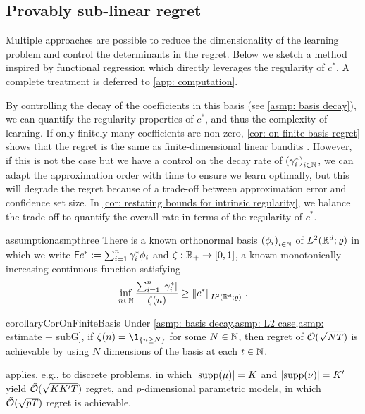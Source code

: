 \subsection{Provably sub-linear regret}\label{subsec: computability}

Multiple approaches are possible to reduce the dimensionality of the learning problem and control the determinants in the regret. Below we sketch a method inspired by functional regression \citep{morris_functional_2015} which directly leverages the regularity of $c^*$. A complete treatment is deferred to \cref{app: computation}.

By controlling the decay of the coefficients in this basis (see \cref{asmp: basis decay}), we can quantify the regularity properties of $c^*$, and thus the complexity of learning. If only finitely-many coefficients are non-zero, \cref{cor: on finite basis regret} shows that the regret is the same as finite-dimensional linear bandits \citep{abbasi-yadkori_improved_2011}. However, if this is not the case but we have a control on the decay rate of ${(\gamma^*_i)}_{i\in\mathbb{N}}$, we can adapt the approximation order with time to ensure we learn optimally, but this will degrade the regret because of a trade-off between approximation error and confidence set size. In \cref{cor: restating bounds for intrinsic regularity}, we balance the trade-off to quantify the overall rate in terms of the regularity of $c^*$. 

\begin{restatable}{assumption}{asmpthree}\label{asmp: basis decay}
    There is a known orthonormal basis ${(\phi_i)}_{i\in\mathbb{N}}$ of $L^2(\mathbb{R}^d;\varrho)$ in which we write $\mathsf{F} c^*:=\sum_{i=1}^n\gamma_i^*\phi_i$ and $\zeta:\mathbb{R}_+\to[0,1]$, a known monotonically increasing continuous function satisfying
    \[ 
        \inf_{n\in\mathbb{N}}\frac{\sum_{i=1}^{n}\left\lvert \gamma_i^* \right\rvert}{\zeta(n)}\ge \left\lVert c^*\right\rVert_{L^2(\mathbb{R}^d;\varrho)}\,.
    \]
\end{restatable}

\begin{restatable}{corollary}{CorOnFiniteBasis}\label{cor: on finite basis regret}
    Under \cref{asmp: basis decay,asmp: L2 case,asmp: estimate + subG}, if $\zeta(n)=\1_{\{n\ge N\}}$ for some $N\in\mathbb{N}$, then regret of $\tilde{\mathcal{O}}(\sqrt{NT})$ is achievable by using $N$ dimensions of the basis at each $t\in\mathbb{N}$.
\end{restatable}

 applies, e.g., to discrete problems, in which $\left\lvert \text{supp}(\mu) \right\rvert=K$ and $\left\lvert \text{supp}(\nu) \right\rvert=K'$ yield $\tilde{\mathcal{O}}(\sqrt{KK'T})$ regret, and $p$-dimensional parametric models, in which $\tilde{\mathcal{O}}(\sqrt{pT})$ regret is achievable.

